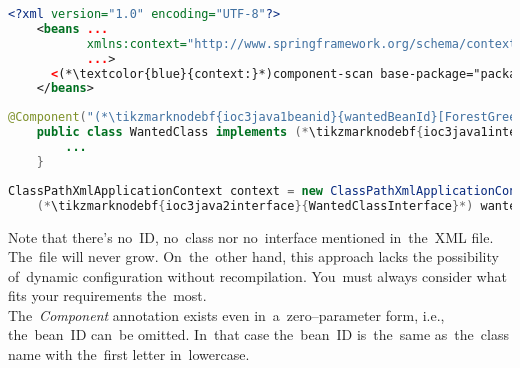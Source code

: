 \example
\begin{lstlisting}[language=XML, title={Configuration XML}]
    <?xml version="1.0" encoding="UTF-8"?>
    <beans ...
           xmlns:context="http://www.springframework.org/schema/context"
           ...>
      <(*\textcolor{blue}{context:}*)component-scan base-package="package.subfolder"/>
    </beans>
\end{lstlisting}
\begin{lstlisting}[language=Java, title={Wanted class}]
    @Component("(*\tikzmarknodebf{ioc3java1beanid}{wantedBeanId}[ForestGreen]*)")
    public class WantedClass implements (*\tikzmarknodebf{ioc3java1interface}{WantedClassInterface}*) {
        ...
    }
\end{lstlisting}
\begin{lstlisting}[language=Java, title={Usage}]
    ClassPathXmlApplicationContext context = new ClassPathXmlApplicationContext("configurationFile.xml");
    (*\tikzmarknodebf{ioc3java2interface}{WantedClassInterface}*) wantedClassInstance = context.getBean("(*\tikzmarknodebf{ioc3java2beanid}{wantedBeanId}[ForestGreen]*)", (*\tikzmarknodebf{ioc3java2interface2}{WantedClassInterface}*).class);
\end{lstlisting}

\noindent Note that there's no~ID, no~class nor no~interface mentioned in~the~XML file. The~file will never grow. On~the~other hand, this approach  lacks the possibility of~dynamic configuration without recompilation. You~must always consider what fits your requirements the~most.\\

\noindent The~\textit{Component} annotation exists even in~a~zero--parameter form, i.e., the~bean~ID can~be omitted. In~that case the~bean~ID is~the~same as~the~class name with the~first letter in~lowercase.
\newpage


